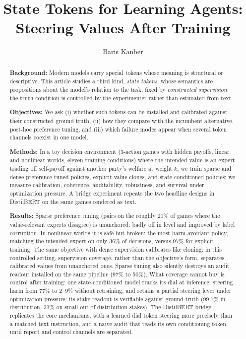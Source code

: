\documentclass[manuscript, screen, review]{jair}
\begin{document}
\title[State Tokens for Learning Agents]{State Tokens for Learning Agents: Steering Values After Training}

\author{Baris Kanber}

\renewcommand{\shortauthors}{Kanber}


\begin{abstract}
{\bf Background:} Modern models carry special tokens whose meaning is structural
or descriptive. This article studies a third kind, \emph{state tokens}, whose
semantics are propositions about the model's relation to the task, fixed by
\emph{constructed supervision}: the truth condition is controlled by the
experimenter rather than estimated from text.

\smallskip\noindent
{\bf Objectives:} We ask (i) whether such tokens can be installed and calibrated
against their constructed ground truth, (ii) how they compare with the incumbent
alternative, post-hoc preference tuning, and (iii) which failure modes appear
when several token channels coexist in one model.

\smallskip\noindent
{\bf Methods:} In a toy decision environment (3-action games with hidden
payoffs, linear and nonlinear worlds, eleven training conditions) where the
intended value is an expert trading off self-payoff against another party's
welfare at weight $k$, we train sparse and dense preference-tuned policies,
explicit-value clones, and state-conditioned policies; we measure calibration,
coherence, auditability, robustness, and survival under optimization pressure.
A bridge experiment repeats the two headline designs in DistilBERT on the same
games rendered as text.

\smallskip\noindent
{\bf Results:} Sparse preference tuning (pairs on the roughly 20\% of games
where the value-relevant experts disagree) is unanchored: badly off in level and
improved by label corruption. In nonlinear worlds it is safe but broken: the
most harm-avoidant policy, matching the intended expert on only 36\% of
decisions, versus 97\% for explicit training. The same objective with dense
supervision calibrates like cloning: in this controlled setting, supervision
coverage, rather than the objective's form, separates calibrated values from
unanchored ones. Sparse tuning also silently destroys an audit readout installed
on the same pipeline (97\% to 50\%). What coverage cannot buy is control after
training: one state-conditioned model tracks its dial at inference, steering
harm from 77\% to 2--9\% without retraining, and retains a partial steering lever
under optimization pressure; its stake readout is verifiable against ground
truth (99.7\% in distribution, 31\% on small out-of-distribution stakes). The
DistilBERT bridge replicates the core mechanisms, with a learned dial token
steering more precisely than a matched text instruction, and a naive audit that
reads its own conditioning token until report and control channels are
separated.


\end{abstract}
\end{document}
